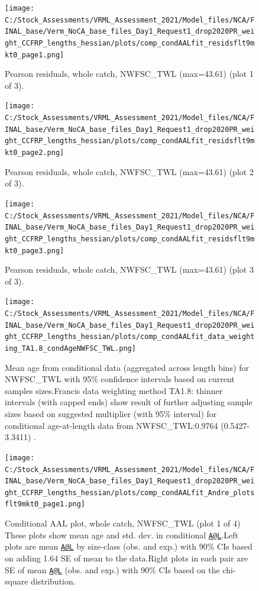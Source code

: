 \documentclass[
  english,
  a4paper,
]{article}
\begin{document}
\begin{figure}
\centering
\texttt{[image: C:/Stock\_Assessments/VRML\_Assessment\_2021/Model\_files/NCA/FINAL\_base/Verm\_NoCA\_base\_files\_Day1\_Request1\_drop2020PR\_weight\_CCFRP\_lengths\_hessian/plots/comp\_condAALfit\_residsflt9mkt0\_page1.png]}
\caption{Pearson residuals, whole catch, NWFSC\_TWL (max=43.61) (plot 1 of 3).\label{fig:comp_condAALfit_residsflt9mkt0_page1}}
\end{figure}

\begin{figure}
\centering
\texttt{[image: C:/Stock\_Assessments/VRML\_Assessment\_2021/Model\_files/NCA/FINAL\_base/Verm\_NoCA\_base\_files\_Day1\_Request1\_drop2020PR\_weight\_CCFRP\_lengths\_hessian/plots/comp\_condAALfit\_residsflt9mkt0\_page2.png]}
\caption{Pearson residuals, whole catch, NWFSC\_TWL (max=43.61) (plot 2 of 3).\label{fig:comp_condAALfit_residsflt9mkt0_page2}}
\end{figure}

\begin{figure}
\centering
\texttt{[image: C:/Stock\_Assessments/VRML\_Assessment\_2021/Model\_files/NCA/FINAL\_base/Verm\_NoCA\_base\_files\_Day1\_Request1\_drop2020PR\_weight\_CCFRP\_lengths\_hessian/plots/comp\_condAALfit\_residsflt9mkt0\_page3.png]}
\caption{Pearson residuals, whole catch, NWFSC\_TWL (max=43.61) (plot 3 of 3).\label{fig:comp_condAALfit_residsflt9mkt0_page3}}
\end{figure}

\begin{figure}
\centering
\texttt{[image: C:/Stock\_Assessments/VRML\_Assessment\_2021/Model\_files/NCA/FINAL\_base/Verm\_NoCA\_base\_files\_Day1\_Request1\_drop2020PR\_weight\_CCFRP\_lengths\_hessian/plots/comp\_condAALfit\_data\_weighting\_TA1.8\_condAgeNWFSC\_TWL.png]}
\caption{Mean age from conditional data (aggregated across length bins) for NWFSC\_TWL with 95\% confidence intervals based on current samples sizes.Francis data weighting method TA1.8: thinner intervals (with capped ends) show result of further adjusting sample sizes based on suggested multiplier (with 95\% interval) for conditional age-at-length data from NWFSC\_TWL:0.9764 (0.5427-3.3411) .\label{fig:comp_condAALfit_data_weighting_TA1.8_condAgeNWFSC_TWL}}
\end{figure}

\begin{figure}
\centering
\texttt{[image: C:/Stock\_Assessments/VRML\_Assessment\_2021/Model\_files/NCA/FINAL\_base/Verm\_NoCA\_base\_files\_Day1\_Request1\_drop2020PR\_weight\_CCFRP\_lengths\_hessian/plots/comp\_condAALfit\_Andre\_plotsflt9mkt0\_page1.png]}
\caption{Conditional AAL plot, whole catch, NWFSC\_TWL (plot 1 of 4)
These plots show mean age and std. dev. in conditional \href{mailto:A@L}{\nolinkurl{A@L}}.Left plots are mean \href{mailto:A@L}{\nolinkurl{A@L}} by size-class (obs. and exp.) with 90\% CIs based on adding 1.64 SE of mean to the data.Right plots in each pair are SE of mean \href{mailto:A@L}{\nolinkurl{A@L}} (obs. and exp.) with 90\% CIs based on the chi-square distribution.\label{fig:comp_condAALfit_Andre_plotsflt9mkt0_page1}}
\end{figure}
\end{document}
